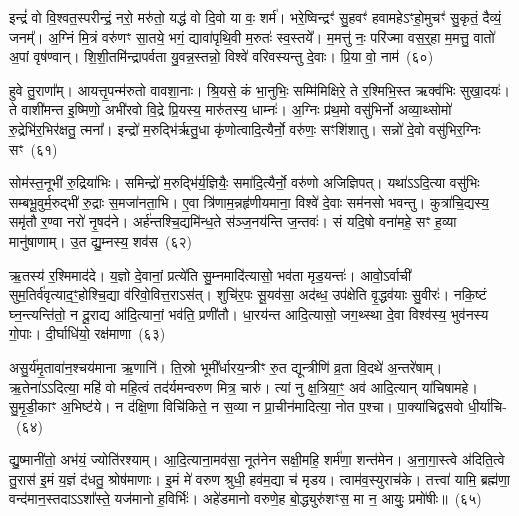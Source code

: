 {\anuvakamend[{ल॒लामः॒ स ए॒व षट्च॑त्वारिꣳशच्च}]}%

इन्द्रं॑ वो वि॒श्वत॒स्परीन्द्रं॒ नरो॒ मरु॑तो॒ यद्ध॑ वो दि॒वो या वः॒ शर्म॑। भरे॒ष्विन्द्रꣳ॑ सु॒हवꣳ॑ हवामहे\-ऽꣳहो॒मुचꣳ॑ सु॒कृतं॒ दैव्यं॒ जनम्᳚। अ॒ग्निं मि॒त्रं वरु॑णꣳ सा॒तये॒ भगं॒ द्यावा॑\-पृथि॒वी म॒रुतः॑ स्व॒स्तये᳚। म॒मत्तु॑ नः॒ परि॑ज्मा वस॒र्॒\mbox{}हा म॒मत्तु॒ वातो॑ अ॒पां वृष॑ण्वान्। शि॒शी॒तमि॑न्द्रापर्वता यु॒वन्न॒स्तन्नो॒ विश्वे॑ वरिवस्यन्तु दे॒वाः। प्रि॒या वो॒ नाम॑~(६०)

हुवे तु॒राणा᳚म्। आयत्तृ॒पन्म॑रुतो वावशा॒नाः। श्रि॒यसे॒ कं भा॒नुभिः॒ सम्मि॑मिक्षिरे॒ ते र॒श्मिभि॒स्त ऋक्व॑भिः सुखा॒दयः॑। ते वाशी॑मन्त इ॒ष्मिणो॒ अभी॑रवो वि॒द्रे प्रि॒यस्य॒ मारु॑तस्य॒ धाम्नः॑। अ॒ग्निः प्र॑थ॒मो वसु॑भिर्नो अव्या॒थ्सोमो॑ रु॒द्रेभि॑र॒भिर॑क्षतु॒ त्मना᳚। इन्द्रो॑ म॒रुद्भि॑र्\mbox{}ऋतु॒धा कृ॑णोत्वादि॒त्यैर्नो॒ वरु॑णः॒ सꣳशि॑शातु। सन्नो॑ दे॒वो वसु॑भिर॒ग्निः सꣳ~(६१)

सोम॑स्त॒नूभी॑ रु॒द्रिया॑भिः। समिन्द्रो॑ म॒रुद्भि॑र्य॒ज्ञियैः॒ समा॑दि॒त्यैर्नो॒ वरु॑णो अजिज्ञिपत्। यथा॑\-ऽऽ\-दि॒त्या वसु॑भिः सम्बभू॒वुर्म॒रुद्भी॑ रु॒द्राः स॒मजा॑नता॒भि। ए॒वा त्रि॑णाम॒न्नहृ॑णीयमाना॒ विश्वे॑ दे॒वाः सम॑नसो भवन्तु। कुत्रा॑चि॒द्यस्य॒ समृ॑तौ र॒ण्वा नरो॑ नृ॒षद॑ने। अर्\mbox{}ह॑न्तश्चि॒द्यमि॑न्ध॒ते स॑ञ्ज॒नय॑न्ति ज॒न्तवः॑। सं यदि॒षो वना॑महे॒ सꣳ ह॒व्या मानु॑षाणाम्। उ॒त द्यु॒म्नस्य॒ शव॑स~(६२)

ऋ॒तस्य॑ र॒श्मिमाद॑दे। य॒ज्ञो दे॒वानां॒ प्रत्ये॑ति सु॒म्नमादि॑त्यासो॒ भव॑ता मृड॒यन्तः॑। आवो॒\-ऽर्वाची॑ सुम॒तिर्व॑वृत्या\-द॒ꣳ॒होश्चि॒द्या व॑रिवो॒वित्त॒रा\-ऽस॑त्। शुचि॑र॒पः सू॒यव॑सा॒ अद॑ब्ध॒ उप॑क्षेति वृ॒द्धव॑याः सु॒वीरः॑। नकि॒ष्टं घ्न॒न्त्यन्ति॑तो॒ न दू॒राद्य आ॑दि॒त्यानां॒ भव॑ति॒ प्रणी॑तौ। धा॒रय॑न्त आदि॒त्यासो॒ जग॒थ्स्था दे॒वा विश्व॑स्य॒ भुव॑नस्य गो॒पाः। दी॒र्घाधि॑यो॒ रक्ष॑माणा~(६३)

असु॒र्य॑मृ॒तावा॑न॒श्चय॑माना ऋ॒णानि॑। ति॒स्रो भूमी᳚र्धारय॒न्त्रीꣳ रु॒त द्यून्त्रीणि॑ व्र॒ता वि॒दथे॑ अ॒न्तरे॑षाम्। ऋ॒तेना॑\-ऽऽ\-दित्या॒ महि॑ वो महि॒त्वं तद॑र्यमन्वरुण मित्र॒ चारु॑। त्यां नु क्ष॒त्रिया॒ꣳ॒ अव॑ आदि॒त्यान् या॑चिषामहे। सु॒मृ॒डी॒काꣳ अ॒भिष्ट॑ये। न द॑क्षि॒णा विचि॑किते॒ न स॒व्या न प्रा॒चीन॑मादित्या॒ नोत प॒श्चा। पा॒क्या॑चिद्वसवो धी॒र्या॑चि-~(६४)

द्यु॒ष्मानी॑तो॒ अभ॑यं॒ ज्योति॑रश्याम्। आ॒दि॒त्याना॒मव॑सा॒ नूत॑नेन सक्षी॒महि॒ शर्म॑णा॒ शन्त॑मेन। अ॒ना॒गा॒स्त्वे अ॑दिति॒त्वे तु॒रास॑ इ॒मं य॒ज्ञं द॑धतु॒ श्रोष॑माणाः। इ॒मं मे॑ वरुण श्रुधी॒ हव॑म॒द्या च॑ मृडय। त्वाम॑व॒स्युराच॑के। तत्त्वा॑ यामि॒ ब्रह्म॑णा॒ वन्द॑मान॒स्तदा\-ऽऽ\-शा᳚स्ते॒ यज॑मानो ह॒विर्भिः॑। अहे॑डमानो वरुणे॒ह बो॒द्ध्युरु॑शꣳस॒ मा न॒ आयुः॒ प्रमो॑षीः॥~(६५)

